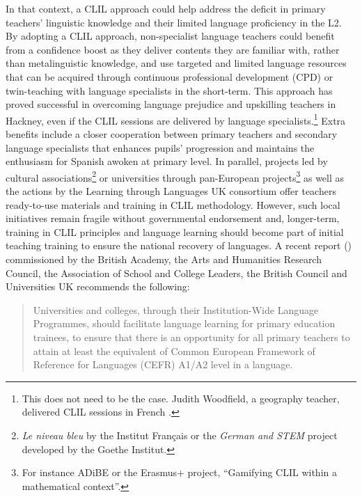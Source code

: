 \documentclass[output=paper]{langscibook}
\begin{document}
In that context, a CLIL approach could help address the deficit in primary teachers’ linguistic knowledge and their limited language proficiency in the L2. By adopting a CLIL approach, non-specialist language teachers could benefit from a confidence boost as they deliver contents they are familiar with, rather than metalinguistic knowledge, and use targeted and limited language resources that can be acquired through continuous professional development (CPD) or twin-teaching with language specialists in the short-term. This approach has proved successful in overcoming language prejudice and upskilling teachers in Hackney, even if the CLIL sessions are delivered by language specialists.\footnote{This does not need to be the case. Judith Woodfield, a geography teacher, delivered CLIL sessions in French \citep{Woodfield2021}.} Extra benefits include a closer cooperation between primary teachers and secondary language specialists that enhances pupils’ progression and maintains the enthusiasm for Spanish awoken at primary level. In parallel, projects led by cultural associations\footnote{\emph{Le niveau bleu} by the Institut Français or the \emph{German and STEM} project developed by the Goethe Institut.} or universities through pan-European projects\footnote{For instance ADiBE or the Erasmus+ project, ``Gamifying CLIL within a mathematical context''.} as well as the actions by the Learning through Languages UK consortium offer teachers ready-to-use materials and training in CLIL methodology. However, such local initiatives remain fragile without governmental endorsement and, longer-term, training in CLIL principles and language learning should become part of initial teaching training to ensure the national recovery of languages. A recent report (\citealt{British2020}) commissioned by the British Academy, the Arts and Humanities Research Council, the Association of School and College Leaders, the British Council and Universities UK recommends the following:

\begin{quote}\sloppy
Universities and colleges, through their Institution-Wide Language Programmes, should facilitate language learning for primary education trainees, to ensure that there is an opportunity for all primary teachers to attain at least the equivalent of Common European Framework of Reference for Languages (CEFR) A1/A2 level in a language. \\\hbox{}\hfill\citep[16]{British2020}\hbox{}
\end{quote}
\end{document}
